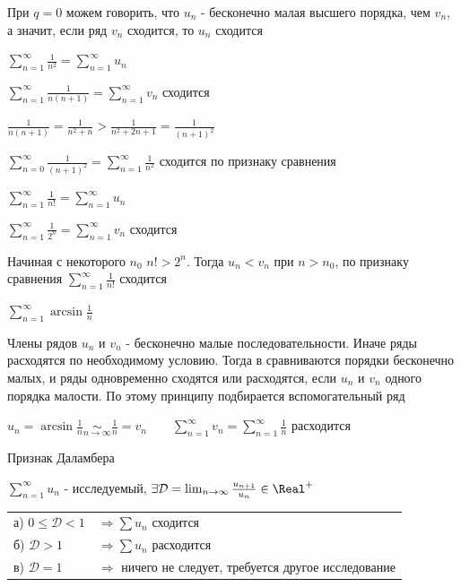 \documentclass[12pt]{article}
\begin{document}
    \Nota При $q = 0$ можем говорить, что $u_n$ - бесконечно малая высшего порядка, чем $v_n$, а значит, если ряд $v_n$
    сходится, то $u_n$ сходится

     $\sum_{n = 1}^\infty \frac{1}{n^2} = \sum_{n = 1}^\infty u_n$

    $\sum_{n = 1}^\infty \frac{1}{n(n + 1)} = \sum_{n = 1}^\infty v_n$ сходится

    $\frac{1}{n(n + 1)} = \frac{1}{n^2 + n} > \frac{1}{n^2 + 2n + 1} = \frac{1}{(n + 1)^2}$

    $\sum_{n = 0}^\infty \frac{1}{(n + 1)^2} = \sum_{n = 1}^\infty \frac{1}{n^2}$ сходится по признаку сравнения

     $\sum_{n = 1}^\infty \frac{1}{n!} = \sum_{n = 1}^\infty u_n$

    $\sum_{n = 1}^\infty \frac{1}{2^n} = \sum_{n = 1}^\infty v_n$ сходится

    Начиная с некоторого $n_0$ $n! > 2^n$. Тогда $u_n < v_n$ при $n > n_0$, по признаку сравнения $\sum_{n = 1}^\infty \frac{1}{n!}$ сходится


     $\sum_{n = 1}^\infty \arcsin \frac{1}{n}$

    \Nota Члены рядов $u_n$ и $v_n$ - бесконечно малые последовательности. Иначе ряды расходятся по необходимому условию.
    Тогда в  сравниваются порядки бесконечно малых, и ряды одновременно сходятся или расходятся, если $u_n$ и $v_n$ одного
    порядка малости. По этому принципу подбирается вспомогательный ряд

    $u_n = \arcsin \frac{1}{n} \underset{n \to \infty}{\sim} \frac{1}{n} = v_n \quad\quad \sum_{n = 1}^\infty v_n = \sum_{n = 1}^\infty \frac{1}{n}$ расходится

    \hypertarget{dalambersign}{}

    \begin{MyTheorem}
         Признак Даламбера

        $\sum_{n = 1}^\infty u_n$ - исследуемый, $\exists \mathcal{D} = \lim_{n \to \infty} \frac{u_{n + 1}}{u_n} \in \Real^+$

        \begin{tabular}{ll}
            а) $0 \leq \mathcal{D} < 1$ & $\Longrightarrow \sum u_n$ сходится                                \\

            б) $\mathcal{D} > 1$        & $\Longrightarrow \sum u_n$ расходится                              \\

            в) $\mathcal{D} = 1$        & $\Longrightarrow$ ничего не следует, требуется другое исследование \\
        \end{tabular}
    \end{MyTheorem}
\end{document}
